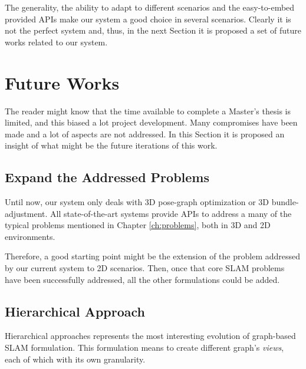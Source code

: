 \noindent The generality, the ability to adapt to different scenarios and the easy-to-embed provided APIs make our system a good choice in several scenarios. Clearly it is not the perfect system and, thus, in the next Section it is proposed a set of future works related to our system.

\section{Future Works}\label{sec:future_works}
The reader might know that the time available to complete a Master's thesis is limited, and this biased a lot project development. Many compromises have been made and a lot of aspects are not addressed. In this Section it is proposed an insight of what might be the future iterations of this work.

\subsection{Expand the Addressed Problems}
Until now, our system only deals with 3D pose-graph optimization or 3D bundle-adjustment. All state-of-the-art systems provide APIs to address a many of the typical problems mentioned in Chapter \ref{ch:problems}, both in 3D and 2D environments.

Therefore, a good starting point might be the extension of the problem addressed by our current system to 2D scenarios. Then, once that core SLAM problems have been successfully addressed, all the other formulations could be added.

\subsection{Hierarchical Approach}
Hierarchical approaches represents the most interesting evolution of graph-based SLAM formulation. This formulation means to create different graph's \textit{views}, each of which with its own granularity.